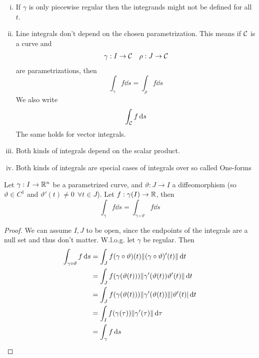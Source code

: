 \documentclass[../../script.tex]{subfiles}
\begin{document}
\begin{rem}
    \begin{enumerate}[(i)]
        \item If $\gamma$ is only piecewise regular then the integrands might not be defined for all $t$.
        \item Line integrals don't depend on the chosen parametrization. This means if $\mathcal{C}$ is a curve and 
        \begin{align*}
            \gamma: I \rightarrow \mathcal{C} && \rho: J \rightarrow \mathcal{C}
        \end{align*}
        are parametrizations, then 
        \[
            \int_{\gamma} f \dd{s} = \int_{\rho} f \dd{s}
        \]
        We also write 
        \[
            \int_{\mathcal{C}} f \dd{s}
        \]
        The same holds for vector integrals. 
        \item Both kinds of integrals depend on the scalar product.
        \item Both kinds of integrals are special cases of integrals over so called One-forms
    \end{enumerate}
\end{rem}

\begin{thm}
    Let $\gamma: I \rightarrow \mathbb{R}^n$ be a parametrized curve, and $\vartheta: J \rightarrow I$ a diffeomorphism 
    (so $\vartheta \in C^1$ and $\vartheta'(t) \ne 0 ~~\forall t \in J$). Let $f: \gamma(I) \rightarrow \mathbb{R}$, then 
    \[
        \int_{\gamma} f \dd{s} = \int_{\gamma \circ \vartheta} f \dd{s}
    \]
\end{thm}
\begin{proof}
    We can assume $I, J$ to be open, since the endpoints of the integrals are a null set and thus don't matter.
    W.l.o.g. let $\gamma$ be regular. Then 
    \begin{equation}
        \begin{split}
            \int_{\gamma \circ \vartheta} f \dd{s} &= \int_J f(\gamma \circ \vartheta)(t) \norm{(\gamma \circ \vartheta)'(t)} \dd{t} \\
            &= \int_J f(\gamma(\vartheta(t))) \norm{\gamma'(\vartheta(t)) \vartheta'(t)} \dd{t} \\
            &= \int_J f(\gamma(\vartheta(t))) \norm{\gamma'(\vartheta(t))} \abs{\vartheta'(t)} \dd{t} \\
            &= \int_I f(\gamma(\tau)) \norm{\gamma'(\tau)} \dd{\tau} \\
            &= \int_{\gamma} f \dd{s}
        \end{split}
    \end{equation}
\end{proof}
\end{document}
